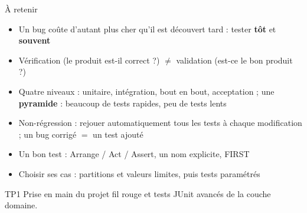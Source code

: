 \documentclass[aspectratio=169,10pt]{beamer}
\begin{document}
\begin{frame}{À retenir}
  \small
  \begin{itemize}
    \item Un bug coûte d'autant plus cher qu'il est découvert tard : tester \textbf{tôt} et \textbf{souvent}
    \item Vérification (le produit est-il correct ?) $\neq$ validation (est-ce le bon produit ?)
    \item Quatre niveaux : unitaire, intégration, bout en bout, acceptation ; une \textbf{pyramide} : beaucoup de tests rapides, peu de tests lents
    \item Non-régression : rejouer automatiquement tous les tests à chaque modification ; un bug corrigé $=$ un test ajouté
    \item Un bon test : Arrange / Act / Assert, un nom explicite, FIRST
    \item Choisir ses cas : partitions et valeurs limites, puis tests paramétrés
  \end{itemize}
  \vspace{3mm}
  \begin{exampleblock}{TP1}
    Prise en main du projet fil rouge et tests JUnit avancés de la couche domaine.
  \end{exampleblock}
\end{frame}

\rquestionslide
\end{document}
